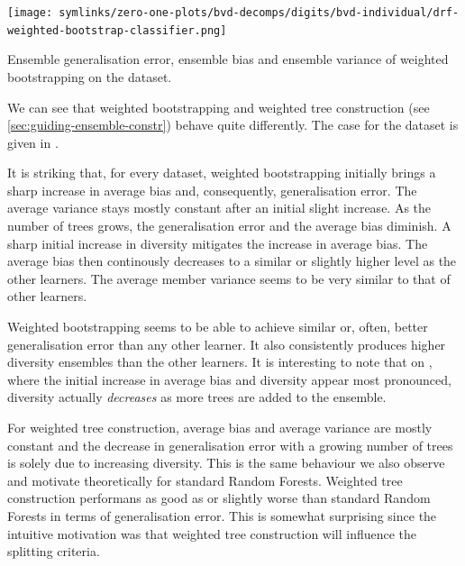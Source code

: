 \documentclass[../main.tex]{subfiles}
\begin{document}
\begin{marginfigure}
    \texttt{[image: symlinks/zero-one-plots/bvd-decomps/digits/bvd-individual/drf-weighted-bootstrap-classifier.png]}
    \caption{
        Ensemble generalisation error, ensemble bias and ensemble variance of weighted bootstrapping on the \digits dataset. 
    }
    \label{fig:digits-bvd}
\end{marginfigure}




%
We can see that weighted bootstrapping and weighted tree construction (see \ref{sec:guiding-ensemble-constr}) behave quite differently. The case for the \spambase dataset is given in . 

It is striking that, for every dataset, weighted bootstrapping initially brings a sharp increase in average bias and, consequently, generalisation error. The average variance stays mostly constant after an initial slight increase. As the number of trees grows, the generalisation error and the average bias diminish. A sharp initial increase in diversity mitigates the increase in average bias. The average bias then continously decreases to a similar or slightly higher level as the other learners. The average member variance seems to be very similar to that of other learners.

Weighted bootstrapping seems to be able to achieve similar or, often, better generalisation error than any other learner.  It also consistently produces higher diversity ensembles than the other learners.
It is interesting to note that on \spambase, where the initial increase in average bias and diversity appear most pronounced, diversity actually \textit{decreases} as more trees are added to the ensemble. 

For weighted tree construction, average bias and average variance are mostly constant and the decrease in generalisation error with a growing number of trees is solely due to increasing diversity. This is the same behaviour we also observe and motivate theoretically for standard Random Forests. Weighted tree construction performans as good as or slightly worse than standard Random Forests in terms of generalisation error. This is somewhat surprising since the intuitive motivation was that weighted tree construction will influence the splitting criteria. 
\end{document}
